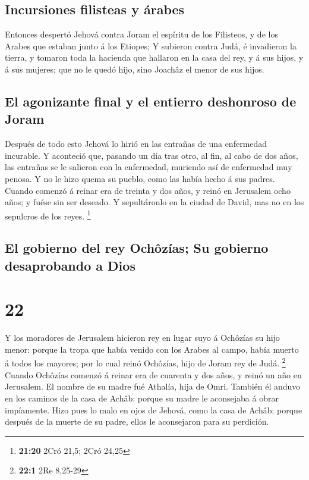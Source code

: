 \hypertarget{incursiones-filisteas-y-uxe1rabes}{%
\subsection{Incursiones filisteas y
árabes}\label{incursiones-filisteas-y-uxe1rabes}}

 Entonces despertó Jehová contra Joram el espíritu de los
Filisteos, y de los Arabes que estaban junto á los Etiopes;
 Y subieron contra Judá, é invadieron la tierra, y tomaron
toda la hacienda que hallaron en la casa del rey, y á sus hijos, y á sus
mujeres; que no le quedó hijo, sino Joachâz el menor de sus hijos.

\hypertarget{el-agonizante-final-y-el-entierro-deshonroso-de-joram}{%
\subsection{El agonizante final y el entierro deshonroso de
Joram}\label{el-agonizante-final-y-el-entierro-deshonroso-de-joram}}

 Después de todo esto Jehová lo hirió en las entrañas de
una enfermedad incurable.  Y aconteció que, pasando un día
tras otro, al fin, al cabo de dos años, las entrañas se le salieron con
la enfermedad, muriendo así de enfermedad muy penosa. Y no le hizo quema
su pueblo, como las había hecho á sus padres.  Cuando
comenzó á reinar era de treinta y dos años, y reinó en Jerusalem ocho
años; y fuése sin ser deseado. Y sepultáronlo en la ciudad de David, mas
no en los sepulcros de los reyes. \footnote{\textbf{21:20} 2Cró 21,5;
  2Cró 24,25}

\hypertarget{el-gobierno-del-rey-ochuxf4zuxedas-su-gobierno-desaprobando-a-dios}{%
\subsection{El gobierno del rey Ochôzías; Su gobierno desaprobando a
Dios}\label{el-gobierno-del-rey-ochuxf4zuxedas-su-gobierno-desaprobando-a-dios}}

\hypertarget{section-21}{%
\section{22}\label{section-21}}

 Y los moradores de Jerusalem hicieron rey en lugar suyo á
Ochôzías su hijo menor: porque la tropa que había venido con los Arabes
al campo, había muerto á todos los mayores; por lo cual reinó Ochôzías,
hijo de Joram rey de Judá. \footnote{\textbf{22:1} 2Re 8,25-29}
 Cuando Ochôzías comenzó á reinar era de cuarenta y dos
años, y reinó un año en Jerusalem. El nombre de su madre fué Athalía,
hija de Omri.  También él anduvo en los caminos de la casa
de Achâb: porque su madre le aconsejaba á obrar impíamente. 
Hizo pues lo malo en ojos de Jehová, como la casa de Achâb; porque
después de la muerte de su padre, ellos le aconsejaron para su
perdición.


